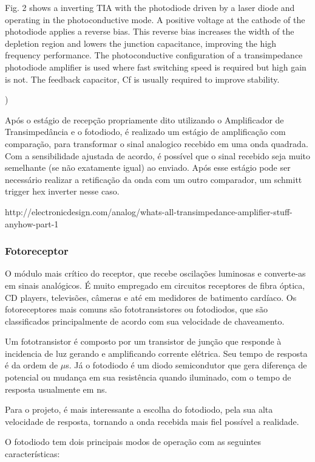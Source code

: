 	Fig. 2 shows a inverting TIA with the photodiode driven by a laser diode and operating in the photoconductive mode. A positive voltage at the cathode of the photodiode applies a reverse bias. This reverse bias increases the width of the depletion region and lowers the junction capacitance, improving the high frequency performance. The photoconductive configuration of a transimpedance photodiode amplifier is used where fast switching speed is required but high gain is not. The feedback capacitor, Cf is usually required to improve stability.
	
	)
	
	Após o estágio de recepção propriamente dito utilizando o Amplificador de Transimpedância e o fotodiodo, é realizado um estágio de amplificação com comparação, para transformar o sinal analogico recebido em uma onda quadrada. Com a sensibilidade ajustada de acordo, é possível que o sinal recebido seja muito semelhante (se não exatamente igual) ao enviado. Após esse estágio pode ser necessário realizar a retificação da onda com um outro comparador, um schmitt trigger hex inverter nesse caso.
	
	http://electronicdesign.com/analog/whats-all-transimpedance-amplifier-stuff-anyhow-part-1

	\subsubsection{Fotoreceptor}\label{hard-photodiode}
	
	O módulo mais crítico do receptor, que recebe oscilações luminosas e converte-as em sinais analógicos. É muito empregado em circuitos receptores de fibra óptica, CD players, televisões, câmeras e até em medidores de batimento cardíaco. Os fotoreceptores mais comuns são fototransistores ou fotodiodos, que são classificados principalmente de acordo com sua velocidade de chaveamento. 
	
	Um fototransistor é composto por um transistor de junção que responde à incidencia de luz gerando e amplificando corrente elétrica. Seu tempo de resposta é da ordem de $\mu$s. Já o fotodiodo é um diodo semicondutor que gera diferença de potencial ou mudança em sua resistência quando iluminado, com o tempo de resposta usualmente em ns.
	
	Para o projeto, é mais interessante a escolha do fotodiodo, pela sua alta velocidade de resposta, tornando a onda recebida mais fiel possível a realidade.
	
	O fotodiodo tem dois principais modos de operação com as seguintes características:
	
